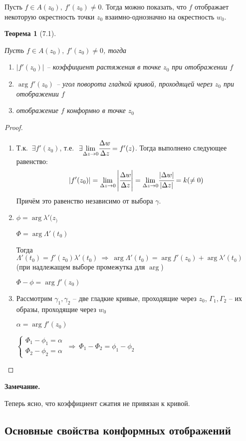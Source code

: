 \documentclass[draft]{article}
\newcommand{\forcenewline}{$\phantom{\mbox{newline}}$\newline}
\newcommand{\then}{\ \Rightarrow\ }
\newcommand{\mlim}[1]{\underset{#1}{\lim}}
\renewcommand{\a}{\alpha}
\newcommand{\g}{\gamma}
\renewcommand{\f}{\phi}
\renewcommand{\l}{\lambda}
\newcommand{\D}{\Delta}
\newcommand{\E}{\ \exists}
\newcommand{\sys}[1]{\left\{\begin{matrix}#1\end{matrix}\right.}
\newtheorem*{theor}{Теорема}
\theoremstyle{remark}
\begin{document}
Пусть $f\in A(z_0),\ f'(z_0)\neq0$. Тогда можно показать, что $f$ отображает некоторую окрестность точки $z_0$ взаимно-однозначно на окрестность $w_0$.

\begin{theor}[7.1]
\forcenewline

Пусть $f\in A(z_0),\ f'(z_0)\neq0$, тогда
\begin{enumerate}
\item[а)] $|f'(z_0)|$ -- коэффициент растяжения в точке $z_0$ при отображении $f$
\item[б)] $\arg f'(z_0)$ -- угол поворота гладкой кривой, проходящей через $z_0$ при отображении $f$
\item[в)] отображение $f$ конформно в точке $z_0$
\end{enumerate}
\end{theor}

\begin{proof}
\forcenewline
\begin{enumerate}
\item[а)] Т.к. $\E f'(z_0)$, т.е. $\E \mlim{\D z\to0}\cfrac{\D w}{\D z}=f'(z)$. Тогда выполнено следующее равенство:
$$|f'(z_0)|=\mlim{\D z\to0}\left|\cfrac{\D w}{\D z}\right|=\mlim{\D z\to0}\cfrac{|\D w|}{|\D z|}=k(\neq0)$$
Причём это равенство независимо от выбора $\g$.
\item[б)] $\f=\arg \l'(z_)$

$\Phi=\arg\Lambda'(t_0)$

Тогда $\Lambda'(t_0)=f'(z_0)\l'(t_0)\then\arg\Lambda'(t_0)=\arg f'(z_0)+\arg\l'(t_0)$ (при надлежащем выборе промежутка для $\arg$)

$\Phi-\f=\arg f'(z_0)$
\item[в)] Рассмотрим $\g_1,\g_2$ -- две гладкие кривые, проходящие через $z_0$, $\Gamma_1,\Gamma_2$ -- их образы, проходящие через $w_0$

$\a=\arg f'(z_0)$

$\sys{\Phi_1-\f_1=\a \\ \Phi_2-\f_2=\a } \then \Phi_1-\Phi_2=\f_1-\f_2$
\end{enumerate}
\end{proof}

{\bfseries Замечание.}

Теперь ясно, что коэффициент сжатия не привязан к кривой.

\subsection{Основные свойства конформных отображений}
\end{document}
